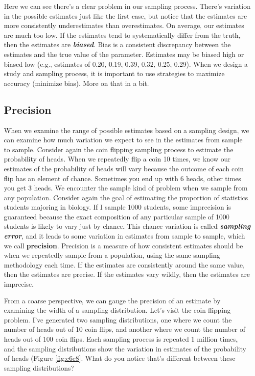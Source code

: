 \documentclass[
]{book}
\begin{document}
Here we can see there's a clear problem in our sampling process. There's variation in the possible estimates just like the first case, but notice that the estimates are more consistently underestimates than overestimates. On average, our estimates are much too low. If the estimates tend to systematically differ from the truth, then the estimates are \textbf{\emph{biased}}. Bias is a consistent discrepancy between the estimates and the true value of the parameter. Estimates may be biased high or biased low (e.g., estimates of 0.20, 0.19, 0.39, 0.32, 0.25, 0.29). When we design a study and sampling process, it is important to use strategies to maximize accuracy (minimize bias). More on that in a bit.

\subsection{Precision}\label{precision}

When we examine the range of possible estimates based on a sampling design, we can examine how much variation we expect to see in the estimates from sample to sample. Consider again the coin flipping sampling process to estimate the probability of heads. When we repeatedly flip a coin 10 times, we know our estimates of the probability of heads will vary because the outcome of each coin flip has an element of chance. Sometimes you end up with 6 heads, other times you get 3 heads. We encounter the sample kind of problem when we sample from any population. Consider again the goal of estimating the proportion of statistics students majoring in biology. If I sample 1000 students, some imprecision is guaranteed because the exact composition of any particular sample of 1000 students is likely to vary just by chance. This chance variation is called \textbf{\emph{sampling error}}, and it leads to some variation in estimates from sample to sample, which we call \textbf{precision}. Precision is a measure of how consistent estimates should be when we repeatedly sample from a population, using the same sampling methodology each time. If the estimates are consistently around the same value, then the estimates are precise. If the estimates vary wildly, then the estimates are imprecise.

From a coarse perspective, we can gauge the precision of an estimate by examining the width of a sampling distribution. Let's visit the coin flipping problem. I've generated two sampling distributions, one where we count the number of heads out of 10 coin flips, and another where we count the number of heads out of 100 coin flips. Each sampling process is repeated 1 million times, and the sampling distributions show the variation in estimates of the probability of heads (Figure \ref{fig:c6c8}. What do you notice that's different between these sampling distributions?
\end{document}
